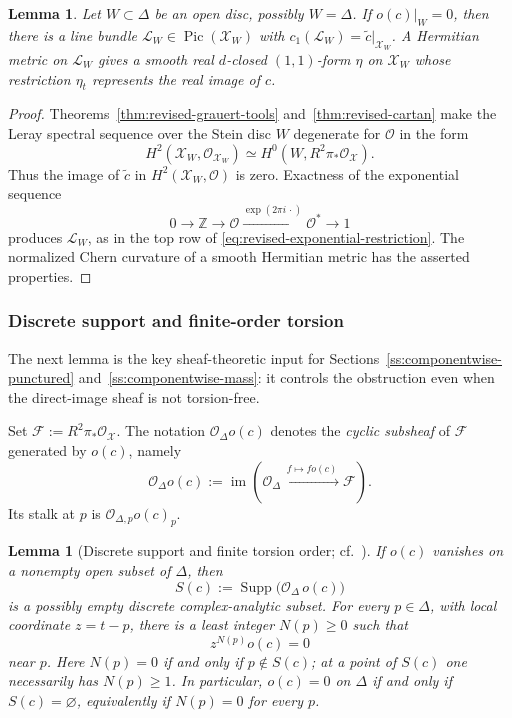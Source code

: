 \documentclass[11pt]{amsart}
\numberwithin{equation}{section}
\theoremstyle{plain}
\newtheorem{lemma}[thm]{Lemma}
\theoremstyle{definition}
\newcommand{\Z}{\mathbb Z}
\newcommand{\cF}{\mathcal F}
\newcommand{\cL}{\mathcal L}
\newcommand{\cO}{\mathcal O}
\newcommand{\cX}{\mathcal X}
\newcommand{\Pic}{\operatorname{Pic}}
\newcommand{\Supp}{\operatorname{Supp}}
\begin{document}
\begin{lemma}\label{lem:revised-local-lift}
Let $W\subset\Delta$ be an open disc, possibly $W=\Delta$.
If $o(c)|_W=0$, then there is a line
bundle $\cL_W\in\Pic(\cX_W)$ with
$c_1(\cL_W)=\widetilde c|_{\cX_W}$.  A Hermitian metric on $\cL_W$ gives a
smooth real $d$-closed $(1,1)$-form $\eta$ on $\cX_W$ whose restriction
$\eta_t$ represents the real image of $c$.
\end{lemma}

\begin{proof}
Theorems~\ref{thm:revised-grauert-tools} and~\ref{thm:revised-cartan}
make the Leray spectral sequence
over the Stein disc $W$ degenerate for $\cO$ in the form
\[
 H^2(\cX_W,\cO_{\cX_W})
 \simeq H^0(W,R^2\pi_*\cO_{\cX}).
\]
Thus the image of $\widetilde c$ in $H^2(\cX_W,\cO)$ is zero.  Exactness
of the exponential sequence
\[
 0\longrightarrow\Z\longrightarrow\cO
 \xrightarrow{\exp(2\pi i\,\cdot)}\cO^*\longrightarrow1
\]
produces $\cL_W$, as in the top row of
\eqref{eq:revised-exponential-restriction}.  The normalized Chern curvature of a
smooth Hermitian metric has the asserted properties.
\end{proof}

\subsubsection{Discrete support and finite-order torsion}
The next lemma is the key sheaf-theoretic input for
Sections~\ref{ss:componentwise-punctured} and~\ref{ss:componentwise-mass}:
it controls the obstruction even when the direct-image sheaf is not
torsion-free.

Set $\cF:=R^2\pi_*\cO_{\cX}$.  The notation $\cO_\Delta o(c)$ denotes
the \emph{cyclic subsheaf} of $\cF$ generated by $o(c)$, namely
\[
 \cO_\Delta o(c):=
 \operatorname{im}\!\left(\cO_\Delta
 \xrightarrow{\,f\mapsto f o(c)\,}\cF\right).
\]
Its stalk at $p$ is $\cO_{\Delta,p}o(c)_p$.
\begin{lemma}[Discrete support and finite torsion order;
cf.\ {\cite[Proposition~4.5]{RT21}}]\label{lem:revised-discrete-support}
If $o(c)$ vanishes on a nonempty open subset of $\Delta$, then
\begin{equation*}
 S(c):=\Supp\bigl(\cO_\Delta\,o(c)\bigr)
\end{equation*}
is a possibly empty discrete complex-analytic subset.  For every
$p\in\Delta$, with local coordinate $z=t-p$, there is a least integer
$N(p)\ge0$ such that
\begin{equation}\label{eq:revised-torsion-order}
 z^{N(p)} o(c)=0
\end{equation}
near $p$.  Here $N(p)=0$ if and only if $p\notin S(c)$; at a point of
$S(c)$ one necessarily has $N(p)\ge1$.  In particular, $o(c)=0$ on
$\Delta$ if and only if $S(c)=\varnothing$, equivalently if $N(p)=0$
for every $p$.
\end{lemma}
\end{document}

